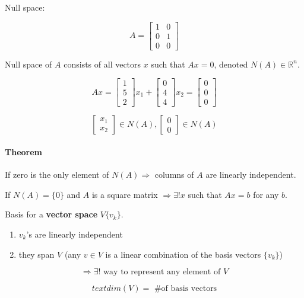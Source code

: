 \documentclass[12pt]{article}
\newcommand{\bbR}{\mathds{R}}
\newcommand{\<}{\langle}
\renewcommand{\>}{\rangle}
\begin{document}
Null space:

\[
	A = \begin{bmatrix}
		1 & 0 \\ 0 & 1 \\ 0 & 0
	\end{bmatrix}
\]	

Null space of $A$ consists of all vectors $x$ such that $Ax = 0$, denoted $N(A) \in \bbR^n$.

\[
	Ax = \begin{bmatrix}
		1 \\ 5 \\ 2
	\end{bmatrix} x_1 + 
	\begin{bmatrix}
		0 \\ 4 \\ 4
	\end{bmatrix} x_2 = 
	\begin{bmatrix}
		0 \\ 0 \\ 0
	\end{bmatrix}
\]

\[
	\begin{bmatrix}
		x_1 \\ x_2
	\end{bmatrix} \in N(A),
	\begin{bmatrix}
		0 \\ 0
	\end{bmatrix} \in N(A)
\]

\paragraph{Theorem} If zero is the only element of $N(A) \Rightarrow$ columns of $A$ are linearly independent.

If $N(A) = \{0\}$ and $A$ is a square matrix $\Rightarrow \exists! x$ such that $Ax = b$ for any $b$.

Basis for a \textbf{vector space} $V \{v_k\}$.

\begin{enumerate}
	\item $v_k$'s are linearly independent
	\item they span $V$ (any $v \in V$ is a linear combination of the basis vectors $\{v_k\}$)
\end{enumerate}

\[
	\Rightarrow \exists! \text{ way to represent any element of } V
\]

\[
	text{dim}(V) = \text{ \# of basis vectors}
\]
\end{document}

